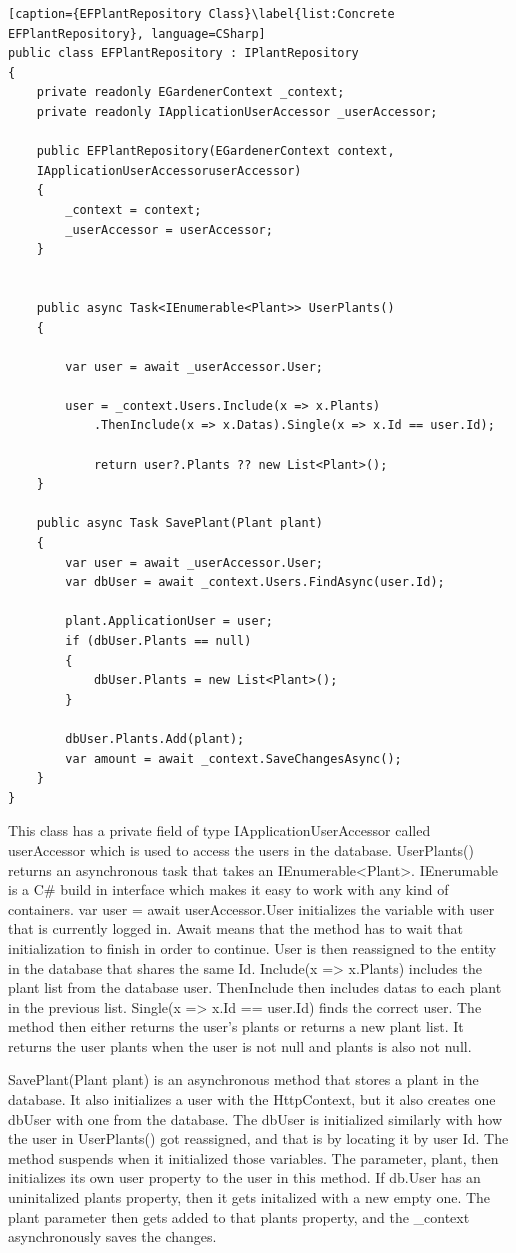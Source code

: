 \documentclass[a4paper,12pt,twoside,openright,titlepage]{book}
\begin{document}
\begin{lstlisting}[caption={EFPlantRepository Class}\label{list:Concrete EFPlantRepository}, language=CSharp]
public class EFPlantRepository : IPlantRepository
{
	private readonly EGardenerContext _context;
    private readonly IApplicationUserAccessor _userAccessor;

	public EFPlantRepository(EGardenerContext context,
	IApplicationUserAccessoruserAccessor)
	{
		_context = context;
        _userAccessor = userAccessor;
	}

        
	public async Task<IEnumerable<Plant>> UserPlants()
	{

		var user = await _userAccessor.User;
            
		user = _context.Users.Include(x => x.Plants)
			.ThenInclude(x => x.Datas).Single(x => x.Id == user.Id);
            
            return user?.Plants ?? new List<Plant>();
	}

	public async Task SavePlant(Plant plant)
	{
		var user = await _userAccessor.User;
		var dbUser = await _context.Users.FindAsync(user.Id);

		plant.ApplicationUser = user;
		if (dbUser.Plants == null)
		{
	        dbUser.Plants = new List<Plant>();
        }
            
        dbUser.Plants.Add(plant);
        var amount = await _context.SaveChangesAsync();
	}
}
\end{lstlisting}
This class has a private field of type IApplicationUserAccessor called userAccessor which is used to access the users in the database. UserPlants() returns an asynchronous task that takes an IEnumerable<Plant>. IEnerumable is a C\#  build in interface which makes it easy to work with any kind of containers. var user = await userAccessor.User initializes the variable with user that is currently logged in. Await means that the method has to wait that initialization to finish in order to continue. User is then reassigned to the entity in the database that shares the same Id. Include(x => x.Plants) includes the plant list from the database user. ThenInclude then includes datas to each plant in the previous list. Single(x => x.Id == user.Id) finds the correct user. The method then either returns the user's plants or returns a new plant list. It returns the user plants when the user is not null and plants is also not null.

SavePlant(Plant plant) is an asynchronous method that stores a plant in the database.  It also initializes a user with the HttpContext, but it also creates one dbUser with one from the database. The dbUser is initialized similarly with how the user in UserPlants() got reassigned, and that is by locating it by user Id. The method suspends when it initialized those variables. The parameter, plant, then initializes its own user property to the user in this method. If db.User has an uninitalized plants property, then it gets initalized with a new empty one. The plant parameter then gets added to that plants property, and the \_context asynchronously saves the changes.
  
\end{document}

